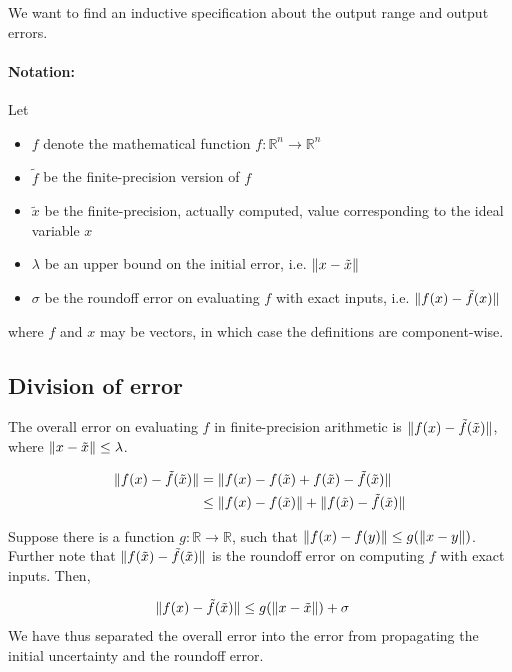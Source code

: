\section{}
\label{theory-errors}
We want to find an inductive specification about the output range and output errors.



\paragraph{Notation:} Let
\begin{itemize}
\item $f$ denote the mathematical function $f: \mathbb{R}^n \to \mathbb{R}^n$
\item $\tilde{f}$ be the finite-precision version of $f$
\item $\tilde{x}$ be the finite-precision, actually computed, value corresponding to the
ideal variable $x$
\item $\lambda$ be an upper bound on the initial error, i.e. $\lVert x - \tilde{x} \rVert$
\item $\sigma$ be the roundoff error on evaluating $f$ with exact inputs, i.e.
  $\lVert f(x) - \tilde{f}(x) \rVert$
\end{itemize}
where $f$ and $x$ may be vectors, in which case the definitions are component-wise.

\subsection{Division of error}
The overall error on evaluating $f$ in finite-precision arithmetic is
  $\lVert f(x) - \tilde{f}(\tilde{x}) \rVert$, where $\lVert x - \tilde{x} \rVert \le \lambda$.

\begin{align}
\lVert f(x) - \tilde{f}(\tilde{x}) \rVert &=
 \lVert f(x) - f(\tilde{x}) + f(\tilde{x}) - \tilde{f}(\tilde{x}) \rVert \\
 &\le \lVert f(x) - f(\tilde{x}) \rVert + \lVert f(\tilde{x}) - \tilde{f}(\tilde{x}) \rVert
\end{align}

Suppose there is a function $g: \mathbb{R} \to \mathbb{R}$, such that $\lVert f(x) - f(y) \rVert \le g(\lVert x - y \rVert)$.
Further note that $\lVert f(\tilde{x}) - \tilde{f}(\tilde{x}) \rVert$ is the roundoff error on
computing $f$ with exact inputs. Then,

\begin{align}
\label{errorLoopBody}
\lVert f(x) - \tilde{f}(\tilde{x}) \rVert &\le g(\lVert x - \tilde{x} \rVert) + \sigma
\end{align}
We have thus separated the overall error into the error from propagating
the initial uncertainty and the roundoff error.

